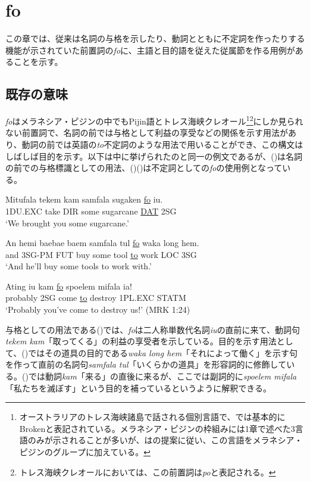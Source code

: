 \chapter{fo}
この章では、従来は名詞の与格を示したり、動詞とともに不定詞を作ったりする機能が示されていた前置詞の\textit{fo}に、主語と目的語を従えた従属節を作る用例があることを示す。

\section{既存の意味}
\textit{fo}はメラネシア・ピジンの中でもPijin語とトレス海峡クレオール\footnote{\label{fn:broken}
オーストラリアのトレス海峡諸島で話される個別言語で、\cite{prepositions}では基本的にBrokenと表記されている。メラネシア・ピジンの枠組みには1章で述べた3言語のみが示されることが多いが、\cite{prepositions}は\cite{keesing}の提案に従い、この言語をメラネシア・ピジンのグループに加えている。}\footnote{トレス海峡クレオールにおいては、この前置詞は\textit{po}と表記される\citep{prepositions}。}にしか見られない前置詞で、名詞の前では与格として利益の享受などの関係を示す用法があり、動詞の前では英語の\textit{to}不定詞のような用法で用いることができ、この構文はしばしば目的を示す\citep{prepositions}。以下は\cite{prepositions}中に挙げられたのと同一の例文であるが、()は名詞の前での与格標識としての用法、()()は不定詞としての\textit{fo}の使用例となっている。

\begin{exe}
\ex
\gll Mitufala tekem kam samfala sugaken \underline{fo} iu.\\
1DU.EXC take DIR some sugarcane \underline{DAT} 2SG\\
\glt `We brought you some sugarcane.' \cite[44]{rr2}

\ex
\gll An hemi baebae baem samfala tul \underline{fo} waka long hem.\\
and 3SG-PM FUT buy some tool \underline{to} work LOC 3SG\\
\glt `And he'll buy some tools to work with.' \cite[270]{todd}

\ex
\gll Ating iu kam \underline{fo} spoelem mifala ia!\\
probably 2SG come \underline{to} destroy 1PL.EXC STATM\\
\glt `Probably you've come to destroy us!' (MRK 1:24)
\end{exe}

与格としての用法である()では、\textit{fo}は二人称単数代名詞\textit{iu}の直前に来て、動詞句\textit{tekem kam}「取ってくる」の利益の享受者を示している。目的を示す用法として、()ではその道具の目的である\textit{waka long hem}「それによって働く」を示す句を作って直前の名詞句\textit{samfala tul}「いくらかの道具」を形容詞的に修飾している。()では動詞\textit{kam}「来る」の直後に来るが、ここでは副詞的に\textit{spoelem mifala}「私たちを滅ぼす」という目的を補っているというように解釈できる。

